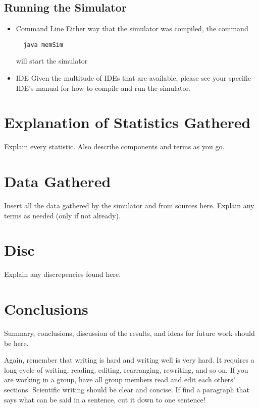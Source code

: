 \documentclass[12pt]{article}
\begin{document}
\subsection{Running the Simulator}
\begin{itemize}
\item Command Line
  Either way that the simulator was compiled, the command
\begin{verbatim}
  java memSim
\end{verbatim}
  will start the simulator
\item IDE
  Given the multitude of IDEs that are available, please see your
  specific IDE's manual for how to compile and run the simulator.
\end{itemize}

\section{Explanation of Statistics Gathered}
\label{sec:expstats}

Explain every statistic. 
Also describe components and terms as you go. 

\section{Data Gathered}
\label{sec:data}

Insert all the data gathered by the simulator and from sources here.
Explain any terms as needed (only if not already). 

\section{Disc}
\label{sec:disc}

Explain any discrepencies found here.

\section{Conclusions}
\label{sec:conclusions}

Summary, conclusions, discussion of the results, and ideas for future
work should be here.

Again, remember that writing is hard and writing well is very hard.  It
requires a long cycle of writing, reading, editing, rearranging,
rewriting, and so on.  If you are working in a group, have all group
members read and edit each others' sections.  Scientific writing
should be clear and concise.  If find a paragraph that says what can
be said in a sentence, cut it down to one sentence!
\end{document}
